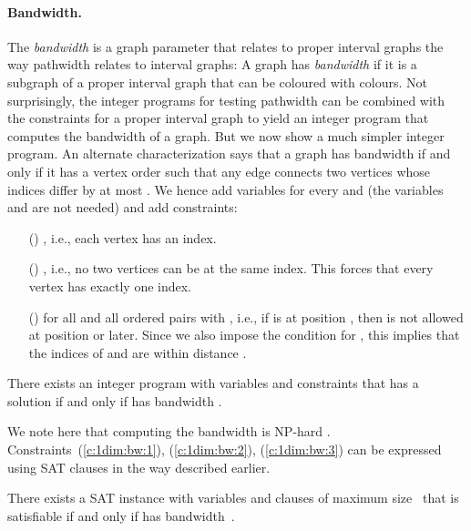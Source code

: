 \documentclass[runningheads]{llncs}
\newcounter{constr}
\newcommand{\constr}[1]{\noindent \refstepcounter{constr}\theconstr #1}
\begin{document}
\paragraph{Bandwidth.}
The {\em bandwidth} is a graph parameter  that relates to proper
interval graphs the way pathwidth relates to interval graphs:
A graph has {\em bandwidth}  if it is a subgraph of
a proper interval graph that can be coloured with  colours.
Not surprisingly, the integer programs for testing
pathwidth can be combined with the constraints for a proper interval
graph to yield an integer program that computes the bandwidth of
a graph.  But we now show a much
simpler integer program.   An alternate
characterization says that a graph has bandwidth  if
and only if it has a vertex order  such that any
edge connects two vertices whose indices differ by at most .
We hence add variables  for every  and 
(the variables  and  are not needed)
and add constraints:
\begin{itemize}
\item[(\constr{\label{c:1dim:bw:1}})]
 , i.e., each vertex has an index.
\item[(\constr{\label{c:1dim:bw:2}})]
 , i.e., no two vertices can be at
	the same index.  This forces that every vertex has exactly one index.
\item[(\constr{\label{c:1dim:bw:3}})] 
  for all  and
	all ordered pairs  with ,
	i.e., if  is at position , then
	 is not allowed at position  or later.  Since we also
	impose the condition for , this implies that the indices
	of  and  are within distance .
\end{itemize}

\begin{theorem}
There exists an integer program with  variables
and  constraints that has a solution if and only if
 has bandwidth .
\end{theorem}
We note here that computing the bandwidth is NP-hard \cite{???}.
Constraints~(\ref{c:1dim:bw:1}), (\ref{c:1dim:bw:2}), (\ref{c:1dim:bw:3})
can be expressed using SAT clauses in the way described earlier.
\begin{theorem}
There exists a SAT instance with  variables
and  clauses 
of maximum size~ that is satisfiable if and only if
 has bandwidth~.
\label{thm:bw:sat}
\end{theorem} 
\end{document}
